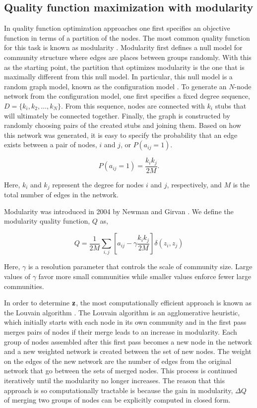 \subsection{Quality function maximization with modularity}
\indent In quality function optimization approaches one first specifies an objective function in terms of a partition of the nodes. The most common quality function for this task is known as modularity \cite{newman2006modularity}. Modularity first defines a null model for community structure where edges are places between groups randomly. With this as the starting point, the partition that optimizes modularity is the one that is maximally different from this null model. In particular, this null model is a random graph model, known as the configuration model \cite{benderCanfield}. To generate an $N$-node network from the configuration model, one first specifies a fixed degree sequence, $D=\{k_{i},k_{2},\dots,k_{N}\}$. From this sequence, nodes are connected with $k_{i}$ stubs that will ultimately be connected together. Finally, the graph is constructed by randomly choosing pairs of the created stubs and joining them. Based on how this network was generated, it is easy to specify the probability that an edge exists between a pair of nodes, $i$ and $j$, or $P(a_{ij}=1)$.

\begin{equation}
P(a_{ij}=1)=\frac{k_{i}k_{j}}{2M}.
\end{equation}

Here, $k_{i}$ and $k_{j}$ represent the degree for nodes $i$ and $j$, respectively, and $M$ is the total number of edges in the network. 

\indent Modularity was introduced in 2004 by Newman and Girvan \cite{newmangirvan}. We define the modularity quality function, $Q$ as,

\begin{equation}
Q=\frac{1}{2M}\sum_{i,j}\left[a_{ij}-\gamma \frac{k_{i}k_{j}}{2M}\right]\delta(z_{i},z_{j})
\end{equation} 

Here, $\gamma$ is a resolution parameter \cite{resParam} that controls the scale of community size. Large values of $\gamma$ favor more small communities while smaller values enforce fewer large communities. 

\indent In order to determine ${\bf z}$, the most computationally efficient approach is known as the Louvain algorithm \cite{blondel}. The Louvain algorithm is an agglomerative heuristic, which initially starts with each node in its own community and in the first pass merges pairs of nodes if their merge leads to an increase in modularity. Each group of nodes assembled after this first pass becomes a new node in the network and a new weighted network is created between the set of new nodes. The weight on the edges of the new network are the number of edges from the original network that go between the sets of merged nodes. This process is continued iteratively until the modularity no longer increases. The reason that this approach is so computationally tractable is because the gain in modularity, $\Delta Q$ of merging two groups of nodes can be explicitly computed in closed form.

